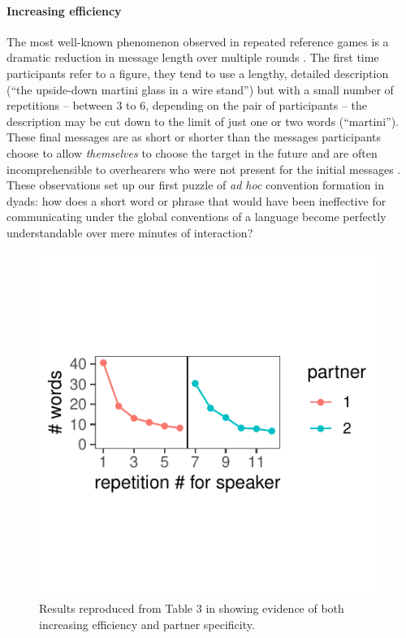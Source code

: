 \paragraph{Increasing efficiency}

The most well-known phenomenon observed in repeated reference games is a dramatic reduction in message length over multiple rounds \cite{krauss_changes_1964, ClarkWilkesGibbs86_ReferringCollaborative, hawkins2020characterizing}. 
The first time participants refer to a figure, they tend to use a lengthy, detailed description (``the upside-down martini glass in a wire stand'') but with a small number of repetitions -- between 3 to 6, depending on the pair of participants -- the description may be cut down to the limit of just one or two words (``martini''). 
These final messages are as short or shorter than the messages participants choose to allow \emph{themselves} to choose the target in the future  \cite{FussellKrauss89_IntendedAudienceCommonGround} and are often incomprehensible to overhearers who were not present for the initial messages \cite{SchoberClark89_Overhearers}.
These observations set up our first puzzle of \emph{ad hoc} convention formation in dyads: how does a short word or phrase that would have been ineffective for communicating under the global conventions of a language become perfectly understandable over mere minutes of interaction? 

\begin{figure}[t!]
\centering
\includegraphics[scale=1]{./figures/clark92}
\vspace{1em}
\caption{Results reproduced from Table 3 in \protect{} showing evidence of both increasing efficiency and partner specificity.}
\label{fig:clark92}
\end{figure}

